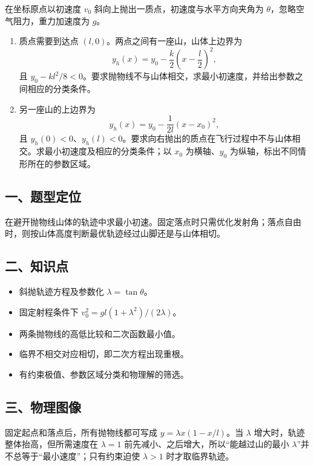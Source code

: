 \documentclass[12pt,a4paper,UTF8]{ctexart}
\newcommand{\tightlist}{\setlength{\itemsep}{0pt}\setlength{\parskip}{0pt}}
\begin{document}
在坐标原点以初速度 \(v_0\) 斜向上抛出一质点，初速度与水平方向夹角为
\(\theta\)，忽略空气阻力，重力加速度为 \(g\)。

\begin{enumerate}
\def\labelenumi{\arabic{enumi}.}
\tightlist
\item
  质点需要到达点 \((l,0)\)。两点之间有一座山，山体上边界为
  \[y_h(x)=y_0-\frac{k}{2}\left(x-\frac l2\right)^2,\] 且
  \(y_0-kl^2/8<0\)。要求抛物线不与山体相交，求最小初速度，并给出参数之间相应的分类条件。
\item
  另一座山的上边界为 \[y_h(x)=y_0-\frac{1}{2l}(x-x_0)^2,\] 且
  \(y_h(0)<0\)、\(y_h(l)<0\)。要求向右抛出的质点在飞行过程中不与山体相交。求最小初速度及相应的分类条件；以
  \(x_0\) 为横轴、\(y_0\) 为纵轴，标出不同情形所在的参数区域。
\end{enumerate}

\subsection{一、题型定位}\label{ux4e00ux9898ux578bux5b9aux4f4d-1}

在避开抛物线山体的轨迹中求最小初速。固定落点时只需优化发射角；落点自由时，则按山体高度判断最优轨迹经过山脚还是与山体相切。

\subsection{二、知识点}\label{ux4e8cux77e5ux8bc6ux70b9-1}

\begin{itemize}
\tightlist
\item
  斜抛轨迹方程及参数化 \(\lambda=\tan\theta\)。
\item
  固定射程条件下 \(v_0^2=gl(1+\lambda^2)/(2\lambda)\)。
\item
  两条抛物线的高低比较和二次函数最小值。
\item
  临界不相交对应相切，即二次方程出现重根。
\item
  有约束极值、参数区域分类和物理解的筛选。
\end{itemize}

\subsection{三、物理图像}\label{ux4e09ux7269ux7406ux56feux50cf-1}

固定起点和落点后，所有抛物线都可写成 \(y=\lambda x(1-x/l)\)。当
\(\lambda\) 增大时，轨迹整体抬高，但所需速度在 \(\lambda=1\)
前先减小、之后增大，所以``能越过山的最小
\(\lambda\)''并不总等于``最小速度''；只有约束迫使 \(\lambda>1\)
时才取临界轨迹。
\end{document}
